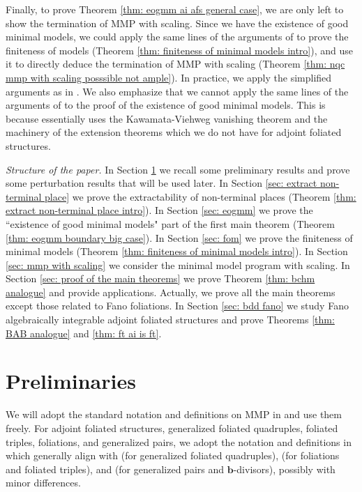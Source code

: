 \documentclass[12pt]{amsart}
\numberwithin{equation}{section}
\newcommand{\bb}{\bm{b}}
\theoremstyle{definition}
\theoremstyle{definition}
\theoremstyle{definition}
\begin{document}
Finally, to prove Theorem \ref{thm: eogmm ai afs general case}, we are only left to show the termination of MMP with scaling. Since we have the existence of good minimal models, we could apply the same lines of the arguments of \cite{BCHM10} to prove the finiteness of models (Theorem \ref{thm: finiteness of minimal models intro}), and use it to directly deduce the termination of MMP with scaling (Theorem \ref{thm: nqc mmp with scaling posssible not ample}). In practice, we apply the simplified arguments as in \cite[Section 10]{HK10}. We also emphasize that we cannot apply the same lines of the arguments of \cite{BCHM10} to the proof of the existence of good minimal models. This is because \cite[Proof of Theorem D]{BCHM10} essentially uses the Kawamata-Viehweg vanishing theorem and the machinery of the extension theorems which we do not have for adjoint foliated structures.

\medskip

\noindent\textit{Structure of the paper.} In Section \ref{sec: preliminaries} we recall some preliminary results and prove some perturbation results that will be used later. In Section \ref{sec: extract non-terminal place} we prove the extractability of non-terminal places (Theorem \ref{thm: extract non-terminal place intro}). In Section \ref{sec: eogmm} we prove the ``existence of good minimal models" part of the first main theorem (Theorem \ref{thm: eogmm boundary big case}). In Section \ref{sec: fom} we prove the finiteness of minimal models (Theorem \ref{thm: finiteness of minimal models intro}). In Section \ref{sec: mmp with scaling} we consider the minimal model program with scaling. In Section \ref{sec: proof of the main theorems} we prove Theorem \ref{thm: bchm analogue} and provide applications. Actually, we prove all the main theorems except those related to Fano foliations. In Section \ref{sec: bdd fano} we study Fano algebraically integrable adjoint foliated structures and prove Theorems \ref{thm: BAB analogue} and \ref{thm: ft ai is ft}.

\section{Preliminaries}\label{sec: preliminaries}

We will adopt the standard notation and definitions on MMP in \cite{KM98,BCHM10} and use them freely. For adjoint foliated structures, generalized foliated quadruples, foliated triples, foliations, and generalized pairs, we adopt the notation and definitions in \cite{CHLMSSX24}  which generally align with \cite{LLM23,CHLX23} (for generalized foliated quadruples), \cite{CS20, ACSS21, CS21} (for foliations and foliated triples), and \cite{BZ16,HL23} (for generalized pairs and $\bb$-divisors), possibly with minor differences. 
\end{document}
